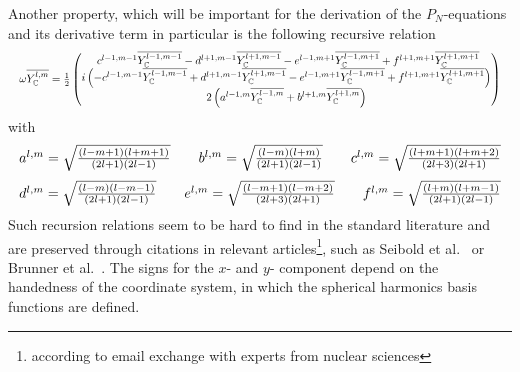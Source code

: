 Another property, which will be important for the derivation of the $P_N$-equations and its derivative term in particular is the following recursive relation
\begin{equation}
\label{eq:recursive_relation}
\resizebox{1.0\hsize}{!}{$\omega\overline{\SHBC^{l,m}} = \frac{1}{2}
\begin{pmatrix}
\ c^{l-1, m-1}\overline{\SHBC^{l-1,m-1}} - d^{l+1, m-1}\overline{\SHBC^{l+1,m-1}} - e^{l-1, m+1}\overline{\SHBC^{l-1,m+1}} + f^{l+1, m+1}\overline{\SHBC^{l+1,m+1}}\\
i\left(-c^{l-1, m-1}\overline{\SHBC^{l-1,m-1}} + d^{l+1, m-1}\overline{\SHBC^{l+1,m-1}} - e^{l-1, m+1}\overline{\SHBC^{l-1,m+1}} + f^{l+1, m+1}\overline{\SHBC^{l+1,m+1}}\right) \\
2\left(a^{l-1, m}\overline{\SHBC^{l-1,m}}+b^{l+1, m}\overline{\SHBC^{l+1,m}}\right)
\end{pmatrix}$}
\end{equation}
with
\begin{equation*}
\resizebox{1.0\hsize}{!}{$
a^{l,m}= \sqrt{\frac{\left(l-m+1\right)\left(l+m+1\right)}{\left(2l+1\right)\left(2l-1\right)}} \qquad
b^{l,m}= \sqrt{\frac{\left(l-m\right)\left(l+m\right)}{\left(2l+1\right)\left(2l-1\right)}} \qquad
c^{l,m}= \sqrt{\frac{\left(l+m+1\right)\left(l+m+2\right)}{\left(2l+3\right)\left(2l+1\right)}}
$}
\end{equation*}
\begin{equation*}
\resizebox{1.0\hsize}{!}{$
d^{l,m}= \sqrt{\frac{\left(l-m\right)\left(l-m-1\right)}{\left(2l+1\right)\left(2l-1\right)}} \qquad
e^{l,m}= \sqrt{\frac{\left(l-m+1\right)\left(l-m+2\right)}{\left(2l+3\right)\left(2l+1\right)}} \qquad
f^{l,m}= \sqrt{\frac{\left(l+m\right)\left(l+m-1\right)}{\left(2l+1\right)\left(2l-1\right)}}
$}
\end{equation*}
Such recursion relations seem to be hard to find in the standard literature and are preserved through citations in relevant articles\footnote{according to email exchange with experts from nuclear sciences}, such as Seibold et al.~\cite{Seibold14} or Brunner et al.~\cite{Brunner05}. The signs for the $x$- and $y$- component depend on the handedness of the coordinate system, in which the spherical harmonics basis functions are defined.